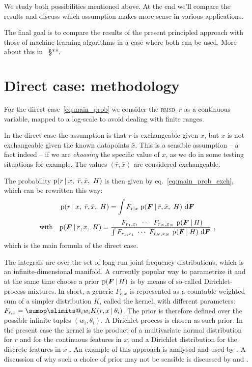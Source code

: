 \documentclass[\ifafour a4paper,12pt,\else a5paper,10pt,\fi%
onecolumn,oneside,article,%
british%
]{memoir}
\makeatletter
\theoremstyle{remark}
\theoremstyle{innote}
\def\sum{\DOTSI\sumop\slimits@}
\newcommand*{\di}{\mathrm{d}}%
\newcommand*{\p}{\mathrm{p}}%
\renewcommand*{\|}[1][]{\nonscript\:#1\vert\nonscript\:\mathopen{}}
\renewcommand*{\=}{\TextOrMath\texteq\eq}
\newcommand*{\sect}{\S}%
\newcommand*{\eqn}{eq.}%
\newcommand*{\wrench}{{\fontencoding{U}\fontfamily{fontawesomethree}\selectfont\symbol{114}}}
\newcommand{\mynote}[1]{ {\color{notecolour}#1}}
\newcommand*{\rmsd}{\textsc{rmsd}}
\newcommand*{\ro}{r}
\newcommand*{\xo}{x}
\newcommand*{\rd}{\bar{r}}
\newcommand*{\xd}{\bar{x}}
\newcommand*{\yF}{\bm{F}}
\makeatother
\begin{document}
We study both possibilities mentioned above. At the end we'll compare the
results and discuss which assumption makes more sense in various
applications.

The final goal is to compare the results of the present principled approach
with those of machine-learning algorithms in a case where both can be used.
More about this in \mynote{\wrench\ \sect***}.


\section{Direct case: methodology}
\label{sec:direct_method}

For the direct case~\eqref{eq:main_prob} we consider the \rmsd\ $r$ as a
continuous variable, mapped to a log-scale to avoid dealing with finite
ranges.

In the direct case the assumption is that $\ro$ is exchangeable given
$\xo$, but $\xo$ is not exchangeable given the known datapoints $\xd$.
This is a sensible assumption -- a fact indeed -- if we are \emph{choosing}
the specific value of $\xo$, as we do in some testing situations for
example. The values $(\rd,\xd)$ are considered exchangeable.

The probability $\p(\ro \| \xo,\ \rd,\xd,\ H)$ is then given by
\eqn~\eqref{eq:main_prob_exch}, which can be rewritten this way:
\begin{equation}
  \label{eq:direct_case_main}
  \begin{gathered}
  \p(\ro \| \xo,\ \rd,\xd,\ H) =
  \int F_{\ro\|\xo} \ \p(\yF \| \rd, \xd,\ H)\ \di\yF
  \\[\jot]
  \text{with}\quad
  \p(\yF \| \rd, \xd,\ H) =
  \frac{
    \ F_{r_{1},x_{1}} \  \dotsm \
  F_{r_{N},x_{N}} \ \p(\yF \| H)
  }{
    \int F_{r_{1},x_{1}} \  \dotsm \
  F_{r_{N},x_{N}} \ \p(\yF \| H)\ \di\yF
  }  \ ,
\end{gathered}
\end{equation}
which is the main formula of the direct case.

The integrals are over the set of long-run joint frequency distributions,
which is an infinite-dimensional manifold. A currently popular way to
parametrize it and at the same time choose a prior $\p(\yF \| H)$ is by
means of so-called Dirichlet-process mixtures. In short, a generic
$F_{r,x}$ is represented as a countable weighted sum of a simpler
distribution $K$, called the kernel, with different parameters:
$F_{r,x} = \sum_{i}w_{i} K(r,x \| \theta_{i})$. The prior is therefore
defined over the possible infinite tuples $(w_{i},\theta_{i})$. A Dirichlet
process is chosen as such prior. In the present case the kernel is the
product of a multivariate normal distribution for $r$ and for the
continuous features in $x$, and a Dirichlet distribution for the discrete
features in $x$ \parencites[\sect~3.3]{liveranietal2015}. An example of
this approach is analysed and used by \textcites{muelleretal1996}. A
discussion of why such a choice of prior may not be sensible is discussed
by \textcite{petrone2017} and \textcite[\sect~4]{quintanaetal2020}.
\end{document}

